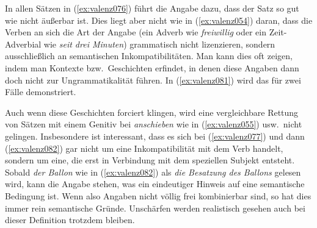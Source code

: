 \begin{exe}
  \ex\label{ex:valenz076}
  \begin{xlist}
  \end{xlist}
\end{exe}

In allen Sätzen in (\ref{ex:valenz076}) führt die Angabe dazu, dass der Satz so gut wie nicht äußerbar ist.
Dies liegt aber nicht wie in (\ref{ex:valenz054}) daran, dass die Verben an sich die Art der Angabe (\zB ein Adverb wie \textit{freiwillig} oder ein Zeit-Adverbial wie \textit{seit drei Minuten}) grammatisch nicht lizenzieren, sondern ausschließlich an semantischen Inkompatibilitäten.
Man kann dies oft zeigen, indem man Kontexte bzw.\ Geschichten erfindet, in denen diese Angaben dann doch nicht zur Ungrammatikalität führen.
In (\ref{ex:valenz081}) wird das für zwei Fälle demonstriert.

\begin{exe}
  \ex\label{ex:valenz081}
  \begin{xlist}
  \end{xlist}
\end{exe}

Auch wenn diese Geschichten forciert klingen, wird eine vergleichbare Rettung von Sätzen mit einem Genitiv bei \textit{anschieben} wie in (\ref{ex:valenz055}) usw.\ nicht gelingen.
Insbesondere ist interessant, dass es sich bei (\ref{ex:valenz077}) und dann (\ref{ex:valenz082}) gar nicht um eine Inkompatibilität mit dem Verb handelt, sondern um eine, die erst in Verbindung mit dem speziellen Subjekt entsteht.
Sobald \textit{der Ballon} wie in (\ref{ex:valenz082}) als \textit{die Besatzung des Ballons} gelesen wird, kann die Angabe stehen, was ein eindeutiger Hinweis auf eine semantische Bedingung ist.
Wenn also Angaben nicht völlig frei kombinierbar sind, so hat dies immer rein semantische Gründe.
Unschärfen werden realistisch gesehen auch bei dieser Definition trotzdem bleiben.

